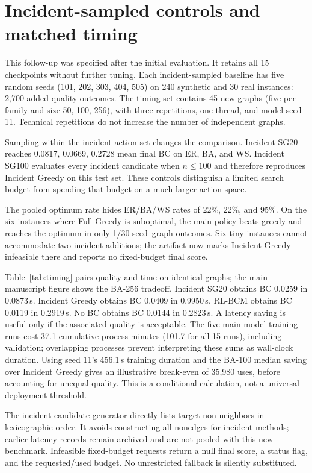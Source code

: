 \section{Incident-sampled controls and matched timing}
This follow-up was specified after the initial evaluation. It retains all 15 checkpoints without further tuning. Each incident-sampled baseline has five random seeds (101, 202, 303, 404, 505) on 240 synthetic and 30 real instances: 2,700 added quality outcomes. The timing set contains 45 new graphs (five per family and size 50, 100, 256), with three repetitions, one thread, and model seed 11. Technical repetitions do not increase the number of independent graphs.

Sampling within the incident action set changes the comparison. Incident SG20 reaches 0.0817, 0.0669, 0.2728 mean final BC on ER, BA, and WS. Incident SG100 evaluates every incident candidate when $n\le100$ and therefore reproduces Incident Greedy on this test set. These controls distinguish a limited search budget from spending that budget on a much larger action space.

The pooled optimum rate hides ER/BA/WS rates of 22\%, 22\%, and 95\%. On the six instances where Full Greedy is suboptimal, the main policy beats greedy and reaches the optimum in only 1/30 seed--graph outcomes. Six tiny instances cannot accommodate two incident additions; the artifact now marks Incident Greedy infeasible there and reports no fixed-budget final score.

Table~\ref{tab:timing} pairs quality and time on identical graphs; the main manuscript figure shows the BA-256 tradeoff. Incident SG20 obtains BC 0.0259 in 0.0873\,s. Incident Greedy obtains BC 0.0409 in 0.9950\,s. RL-BCM obtains BC 0.0119 in 0.2919\,s. No BC obtains BC 0.0144 in 0.2823\,s. A latency saving is useful only if the associated quality is acceptable. The five main-model training runs cost 37.1 cumulative process-minutes (101.7 for all 15 runs), including validation; overlapping processes prevent interpreting these sums as wall-clock duration. Using seed 11's 456.1\,s training duration and the BA-100 median saving over Incident Greedy gives an illustrative break-even of 35,980 uses, before accounting for unequal quality. This is a conditional calculation, not a universal deployment threshold.

The incident candidate generator directly lists target non-neighbors in lexicographic order. It avoids constructing all nonedges for incident methods; earlier latency records remain archived and are not pooled with this new benchmark. Infeasible fixed-budget requests return a null final score, a status flag, and the requested/used budget. No unrestricted fallback is silently substituted.

